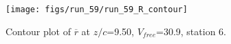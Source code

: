\begin{figure}[H]
\centering
\texttt{[image: figs/run\_59/run\_59\_R\_contour]}
\caption{Contour plot of $\overline{r}$ at $z/c$=9.50, $V_{free}$=30.9, station 6.}
\label{fig:run_59_R_contour}
\end{figure}


